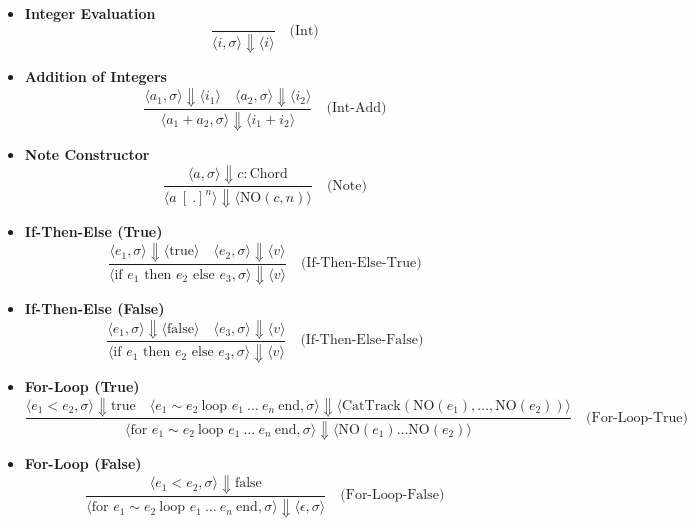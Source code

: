 \documentclass[letterpaper,12pt]{article}
\begin{document}
\begin{itemize}
    \item \textbf{Integer Evaluation}
    \[
    \frac{}{\langle i, \sigma \rangle \Downarrow \langle i \rangle} \quad \text{(Int)}
    \]

    \item \textbf{Addition of Integers}
    \[
    \frac{\langle a_1, \sigma \rangle \Downarrow \langle i_1 \rangle \quad \langle a_2, \sigma \rangle \Downarrow \langle i_2 \rangle}{\langle a_1 + a_2, \sigma \rangle \Downarrow \langle i_1 + i_2 \rangle} \quad \text{(Int-Add)}
    \]

    \item \textbf{Note Constructor}
    \[
    \frac{\langle a, \sigma \rangle \Downarrow c : \text{Chord}}{\langle a \ [\ .]^n \rangle \Downarrow \langle \text{NO}(c, n) \rangle} \quad \text{(Note)}
    \]

    \item \textbf{If-Then-Else (True)}
    \[
    \frac{\langle e_1, \sigma \rangle \Downarrow \langle \text{true} \rangle \quad \langle e_2, \sigma \rangle \Downarrow \langle v \rangle}{\langle \text{if } e_1 \text{ then } e_2 \text{ else } e_3, \sigma \rangle \Downarrow \langle v \rangle} \quad \text{(If-Then-Else-True)}
    \]

    \item \textbf{If-Then-Else (False)}
    \[
    \frac{\langle e_1, \sigma \rangle \Downarrow \langle \text{false} \rangle \quad \langle e_3, \sigma \rangle \Downarrow \langle v \rangle}{\langle \text{if } e_1 \text{ then } e_2 \text{ else } e_3, \sigma \rangle \Downarrow \langle v \rangle} \quad \text{(If-Then-Else-False)}
    \]

    \item \textbf{For-Loop (True)}
    \[
    \frac{\langle e_1 < e_2, \sigma \rangle \Downarrow \text{true} \quad \langle e_1 \sim e_2 \ \text{loop } e_1 \ \dots \ e_n \ \text{end}, \sigma \rangle \Downarrow \langle \text{CatTrack}(\text{NO}(e_1), \dots, \text{NO}(e_2)) \rangle}{\langle \text{for } e_1 \sim e_2 \ \text{loop } e_1 \ \dots \ e_n \ \text{end}, \sigma \rangle \Downarrow \langle \text{NO}(e_1) \dots \text{NO}(e_2) \rangle} \quad \text{(For-Loop-True)}
    \]

    \item \textbf{For-Loop (False)}
    \[
    \frac{\langle e_1 < e_2, \sigma \rangle \Downarrow \text{false}}{\langle \text{for } e_1 \sim e_2 \ \text{loop } e_1 \ \dots \ e_n \ \text{end}, \sigma \rangle \Downarrow \langle \epsilon, \sigma \rangle} \quad \text{(For-Loop-False)}
    \]


\end{itemize}
\end{document}
